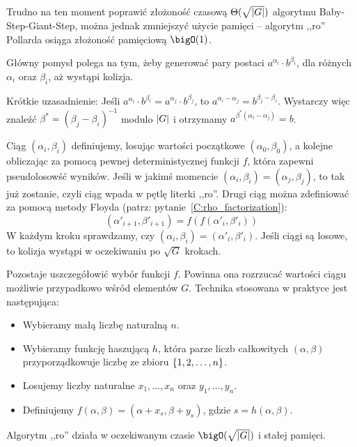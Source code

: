 Trudno na ten moment poprawić złożoność czasową \( \Theta(\sqrt{\left\lvert G\right\rvert}) \) algorytmu Baby-Step-Giant-Step, można jednak zmniejszyć użycie pamięci -- algorytm ,,ro'' Pollarda osiąga złożoność pamięciową \( \bigO(1) \).

Główny pomysł polega na tym, żeby generować pary postaci \( a^{\alpha_i} \cdot b^{\beta_i} \), dla różnych \( \alpha_i \) oraz \( \beta_i \), aż wystąpi kolizja.

Krótkie uzasadnienie: Jeśli \( a^{\alpha_i} \cdot b^{\beta_i} = a^{\alpha_j} \cdot b^{\beta_j} \), to \( a^{\alpha_i - \alpha_j} = b^{\beta_j - \beta_i} \). Wystarczy więc znaleźć \( \beta^{*} = (\beta_j - \beta_i)^{-1} \) modulo \( \left\lvert G\right\rvert \) i otrzymamy \( a^{\beta^{*} (\alpha_i - \alpha_j)} = b \).

Ciąg \( (\alpha_i, \beta_i) \) definiujemy, losując wartości początkowe \( (\alpha_0, \beta_0) \), a kolejne obliczając za pomocą pewnej deterministycznej funkcji \( f \), która zapewni pseudolosowść wyników.
Jeśli w jakimś momencie \( (\alpha_i, \beta_i) = (\alpha_j, \beta_j) \), to tak już zostanie, czyli ciąg wpada w pętlę literki ,,ro''. Drugi ciąg można zdefiniować za pomocą metody Floyda (patrz: pytanie~\ref{C:rho_factorization}):
\[ (\alpha'_{i+1}, \beta'_{i+1}) = f(f(\alpha'_i, \beta'_i)) \]
W każdym kroku sprawdzamy, czy \( (\alpha_i, \beta_i) = (\alpha'_i, \beta'_i) \). Jeśli ciągi są losowe, to kolizja wystąpi w oczekiwaniu po \( \sqrt{G} \) krokach.

Pozostaje uszczegółowić wybór funkcji \( f \). Powinna ona rozrzucać wartości ciągu możliwie przypadkowo wśród elementów \( G \). Technika stosowana w praktyce jest następująca:
\begin{itemize}
    \onehalfspacing
    \item Wybieramy małą liczbę naturalną \( n \).
    \item Wybieramy funkcję haszującą \( h \), która parze liczb całkowitych \( (\alpha, \beta) \) przyporządkowuje liczbę ze zbioru \( \set{1, 2, \dots, n} \).
    \item Losujemy liczby naturalne \( x_1, \dots, x_n \) oraz \( y_1, \dots, y_n \).
    \item Definiujemy \( f(\alpha, \beta) = (\alpha + x_s, \beta + y_s) \), gdzie \( s = h(\alpha, \beta) \).
\end{itemize}

Algorytm ,,ro'' działa w oczekiwanym czasie \( \bigO(\sqrt{\abs{G}}) \) i stałej pamięci.